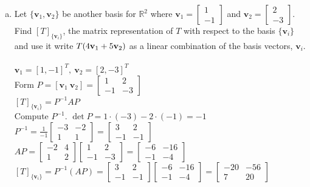 \documentclass{article}
\begin{document}
{{\begin{enumerate}
\begin{enumerate}[a.]
\item Let $\{\textbf{v}_1,\textbf{v}_2\}$ be another basis for $\mathbb{R}^2$ where $\textbf{v}_1=\left[
\begin{array}{ccc}
1 \\
-1 
\end{array} \right]$ and 
$\textbf{v}_2=
\left[
\begin{array}{ccc}
2 \\
-3 
\end{array} \right]$. Find $[T]_{\{\textbf{v}_i\}}$, the matrix representation of $T$ with respect to the basis $\{\textbf{v}_i\}$ and use it write 
$T(4{\bf v}_1+5{\bf v}_2)$ as a linear combination of the basis vectors, $\textbf{v}_i$.
\\
\\$\mathbf v_1=[1,-1]^T,\ \mathbf v_2=[2,-3]^T$
\\Form $P=[\mathbf v_1\ \mathbf v_2]=\begin{bmatrix}1&2\\-1&-3\end{bmatrix}$
\\$[T]_{\{\mathbf v_i\}} = P^{-1}AP$
\\Compute $P^{-1}$. $\det P = 1\cdot(-3)-2\cdot(-1)=-1$
\\$P^{-1}=\frac{1}{-1}\begin{bmatrix}-3&-2\\[4pt]1&1\end{bmatrix}=\begin{bmatrix}3&2\\[4pt]-1&-1\end{bmatrix}$
\\$AP = \begin{bmatrix}-2&4\\[4pt]1&2\end{bmatrix}\begin{bmatrix}1&2\\-1&-3\end{bmatrix}= \begin{bmatrix}-6 & -16\\[4pt]-1 & -4\end{bmatrix}$
\\$[T]_{\{\mathbf v_i\}} = P^{-1}(AP)=\begin{bmatrix}3&2\\[4pt]-1&-1\end{bmatrix} \begin{bmatrix}-6 & -16\\[4pt]-1 & -4\end{bmatrix} =\begin{bmatrix}-20 & -56\\[4pt]7 & 20\end{bmatrix}$

\end{enumerate}
\end{enumerate}}}
\end{document}
